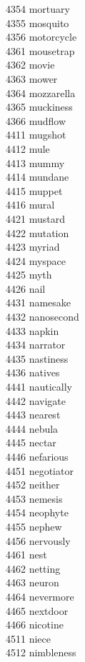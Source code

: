 4354 mortuary \\
4355 mosquito \\
4356 motorcycle \\
4361 mousetrap \\
4362 movie \\
4363 mower \\
4364 mozzarella \\
4365 muckiness \\
4366 mudflow \\
4411 mugshot \\
4412 mule \\
4413 mummy \\
4414 mundane \\
4415 muppet \\
4416 mural \\
4421 mustard \\
4422 mutation \\
4423 myriad \\
4424 myspace \\
4425 myth \\
4426 nail \\
4431 namesake \\
4432 nanosecond \\
4433 napkin \\
4434 narrator \\
4435 nastiness \\
4436 natives \\
4441 nautically \\
4442 navigate \\
4443 nearest \\
4444 nebula \\
4445 nectar \\
4446 nefarious \\
4451 negotiator \\
4452 neither \\
4453 nemesis \\
4454 neophyte \\
4455 nephew \\
4456 nervously \\
4461 nest \\
4462 netting \\
4463 neuron \\
4464 nevermore \\
4465 nextdoor \\
4466 nicotine \\
4511 niece \\
4512 nimbleness \\
